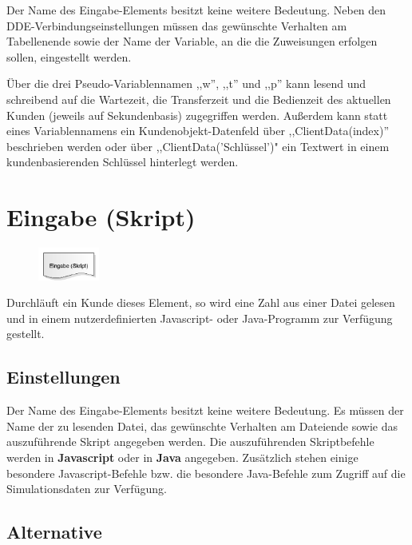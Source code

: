 Der Name des Eingabe-Elements besitzt keine weitere Bedeutung. Neben den DDE-Verbindungseinstellungen
müssen das gewünschte Verhalten am Tabellenende
sowie der Name der Variable, an die die Zuweisungen erfolgen sollen, eingestellt werden.

Über die drei Pseudo-Variablennamen ,,w'', ,,t'' und ,,p'' kann lesend und schreibend auf die Wartezeit, die Transferzeit
und die Bedienzeit des aktuellen Kunden (jeweils auf Sekundenbasis) zugegriffen werden. Außerdem kann statt eines
Variablennamens ein Kundenobjekt-Datenfeld über ,,ClientData(index)'' beschrieben werden oder über ,,ClientData('Schlüssel')"
ein Textwert in einem kundenbasierenden Schlüssel hinterlegt werden.


\section{Eingabe (Skript)}
\label{ref:ModelElementInputJS}

\begin{figure}
\vspace{-22pt}
\includegraphics[width=2cm]{imageModelElementInputJS.png}
\vspace{-22pt}
\end{figure}

Durchläuft ein Kunde dieses Element, so wird eine Zahl aus einer Datei gelesen und in
einem nutzerdefinierten Javascript- oder Java-Programm zur Verfügung gestellt. 

\subsection*{Einstellungen}

Der Name des Eingabe-Elements besitzt keine weitere Bedeutung. Es müssen der Name der zu lesenden
Datei, das gewünschte Verhalten am Dateiende sowie das auszuführende Skript angegeben werden.
Die auszuführenden Skriptbefehle werden in \textbf{Javascript} oder in \textbf{Java} angegeben.
Zusätzlich stehen einige besondere Javascript-Befehle bzw.
die besondere Java-Befehle 
zum Zugriff auf die Simulationsdaten zur Verfügung.

\subsection*{Alternative}

